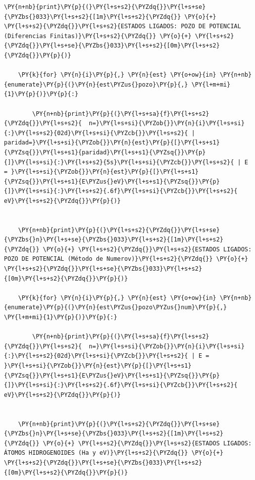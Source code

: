 \documentclass[11pt]{article}
\makeatletter
\def\PY@reset{\let\PY@it=\relax \let\PY@bf=\relax \let\PY@ul=\relax \let\PY@tc=\relax \let\PY@bc=\relax \let\PY@ff=\relax}
\def\PY@tok#1{\csname PY@tok@#1\endcsname}
\def\PY@toks#1+{\ifx\relax#1\empty\else \PY@tok{#1}\expandafter\PY@toks\fi}
\def\PY@do#1{\PY@bc{\PY@tc{\PY@ul{\PY@it{\PY@bf{\PY@ff{#1}}}}}}}
\def\PY#1#2{\PY@reset\PY@toks#1+\relax+\PY@do{#2}}
\def\PYZbs{\char`\\} \def\PYZus{\char`\_} \def\PYZob{\char`\{} \def\PYZcb{\char`\}} \def\PYZca{\char`\^} \def\PYZam{\char`\&} \def\PYZlt{\char`\<} \def\PYZgt{\char`\>} \def\PYZsh{\char`\#} \def\PYZpc{\char`\%} \def\PYZdl{\char`\$} \def\PYZhy{\char`\-} \def\PYZsq{\char`\'} \def\PYZdq{\char`\"} \def\PYZti{\char`\~}
\makeatother
\begin{document}
\begin{tcolorbox}[breakable, size=fbox, boxrule=1pt, pad at break*=1mm,colback=cellbackground, colframe=cellborder]
\begin{Verbatim}[commandchars=\\\{\}]
    \PY{n+nb}{print}\PY{p}{(}\PY{l+s+s2}{\PYZdq{}}\PY{l+s+se}{\PYZbs{}033}\PY{l+s+s2}{[1m}\PY{l+s+s2}{\PYZdq{}} \PY{o}{+} \PY{l+s+s2}{\PYZdq{}}\PY{l+s+s2}{ESTADOS LIGADOS: POZO DE POTENCIAL (Diferencias Finitas)}\PY{l+s+s2}{\PYZdq{}} \PY{o}{+} \PY{l+s+s2}{\PYZdq{}}\PY{l+s+se}{\PYZbs{}033}\PY{l+s+s2}{[0m}\PY{l+s+s2}{\PYZdq{}}\PY{p}{)}

    \PY{k}{for} \PY{n}{i}\PY{p}{,} \PY{n}{est} \PY{o+ow}{in} \PY{n+nb}{enumerate}\PY{p}{(}\PY{n}{est\PYZus{}pozo}\PY{p}{,} \PY{l+m+mi}{1}\PY{p}{)}\PY{p}{:}

        \PY{n+nb}{print}\PY{p}{(}\PY{l+s+sa}{f}\PY{l+s+s2}{\PYZdq{}}\PY{l+s+s2}{  n=}\PY{l+s+si}{\PYZob{}}\PY{n}{i}\PY{l+s+si}{:}\PY{l+s+s2}{02d}\PY{l+s+si}{\PYZcb{}}\PY{l+s+s2}{ | paridad=}\PY{l+s+si}{\PYZob{}}\PY{n}{est}\PY{p}{[}\PY{l+s+s1}{\PYZsq{}}\PY{l+s+s1}{paridad}\PY{l+s+s1}{\PYZsq{}}\PY{p}{]}\PY{l+s+si}{:}\PY{l+s+s2}{5s}\PY{l+s+si}{\PYZcb{}}\PY{l+s+s2}{ | E = }\PY{l+s+si}{\PYZob{}}\PY{n}{est}\PY{p}{[}\PY{l+s+s1}{\PYZsq{}}\PY{l+s+s1}{E\PYZus{}eV}\PY{l+s+s1}{\PYZsq{}}\PY{p}{]}\PY{l+s+si}{:}\PY{l+s+s2}{.6f}\PY{l+s+si}{\PYZcb{}}\PY{l+s+s2}{ eV}\PY{l+s+s2}{\PYZdq{}}\PY{p}{)}


    \PY{n+nb}{print}\PY{p}{(}\PY{l+s+s2}{\PYZdq{}}\PY{l+s+se}{\PYZbs{}n}\PY{l+s+se}{\PYZbs{}033}\PY{l+s+s2}{[1m}\PY{l+s+s2}{\PYZdq{}} \PY{o}{+} \PY{l+s+s2}{\PYZdq{}}\PY{l+s+s2}{ESTADOS LIGADOS: POZO DE POTENCIAL (Método de Numerov)}\PY{l+s+s2}{\PYZdq{}} \PY{o}{+} \PY{l+s+s2}{\PYZdq{}}\PY{l+s+se}{\PYZbs{}033}\PY{l+s+s2}{[0m}\PY{l+s+s2}{\PYZdq{}}\PY{p}{)}

    \PY{k}{for} \PY{n}{i}\PY{p}{,} \PY{n}{est} \PY{o+ow}{in} \PY{n+nb}{enumerate}\PY{p}{(}\PY{n}{est\PYZus{}pozo\PYZus{}num}\PY{p}{,} \PY{l+m+mi}{1}\PY{p}{)}\PY{p}{:}

        \PY{n+nb}{print}\PY{p}{(}\PY{l+s+sa}{f}\PY{l+s+s2}{\PYZdq{}}\PY{l+s+s2}{  n=}\PY{l+s+si}{\PYZob{}}\PY{n}{i}\PY{l+s+si}{:}\PY{l+s+s2}{02d}\PY{l+s+si}{\PYZcb{}}\PY{l+s+s2}{ | E = }\PY{l+s+si}{\PYZob{}}\PY{n}{est}\PY{p}{[}\PY{l+s+s1}{\PYZsq{}}\PY{l+s+s1}{E\PYZus{}eV}\PY{l+s+s1}{\PYZsq{}}\PY{p}{]}\PY{l+s+si}{:}\PY{l+s+s2}{.6f}\PY{l+s+si}{\PYZcb{}}\PY{l+s+s2}{ eV}\PY{l+s+s2}{\PYZdq{}}\PY{p}{)}


    \PY{n+nb}{print}\PY{p}{(}\PY{l+s+s2}{\PYZdq{}}\PY{l+s+se}{\PYZbs{}n}\PY{l+s+se}{\PYZbs{}033}\PY{l+s+s2}{[1m}\PY{l+s+s2}{\PYZdq{}} \PY{o}{+} \PY{l+s+s2}{\PYZdq{}}\PY{l+s+s2}{ESTADOS LIGADOS: ÁTOMOS HIDROGENOIDES (Ha y eV)}\PY{l+s+s2}{\PYZdq{}} \PY{o}{+} \PY{l+s+s2}{\PYZdq{}}\PY{l+s+se}{\PYZbs{}033}\PY{l+s+s2}{[0m}\PY{l+s+s2}{\PYZdq{}}\PY{p}{)}


\end{Verbatim}
\end{tcolorbox}
\end{document}
